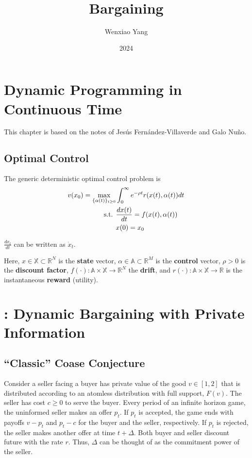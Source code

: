 \documentclass[11pt]{elegantbook}
\title{Bargaining}
\author{Wenxiao Yang}
\institute{Haas School of Business, University of California Berkeley}
\date{2024}
\begin{document}
\maketitle

\frontmatter
\tableofcontents

\mainmatter

\chapter{Dynamic Programming in Continuous Time}
This chapter is based on the notes of Jesús Fernández-Villaverde and Galo Nuño.

\section{Optimal Control}
\begin{definition}
    The generic deterministic optimal control problem is
    \begin{equation}
        \begin{aligned}
            v(x_0)=\max_{\{\alpha(t)\}_{t\geq 0}}&\int_0^\infty e^{-\rho t}r(x(t),\alpha(t))dt\\
            \textnormal{s.t. }&\frac{dx(t)}{dt}=f(x(t),\alpha(t))\\
            &x(0)=x_0
        \end{aligned}
        \nonumber
    \end{equation}
    \begin{note}
        $\frac{dx_t}{dt}$ can be written as $\dot{x}_t$.
    \end{note}
    Here, $x\in\mathbb{X}\subset \mathbb{R}^N$ is the \textbf{state} vector, $\alpha\in \mathbb{A}\subset \mathbb{R}^M$ is the \textbf{control} vector, $\rho>0$ is the \textbf{discount factor}, $f(\cdot):\mathbb{A}\times \mathbb{X} \rightarrow \mathbb{R}^N$ the \textbf{drift}, and $r(\cdot):\mathbb{A}\times \mathbb{X} \rightarrow \mathbb{R}$ is the instantaneous \textbf{reward} (utility).
\end{definition}



\chapter{\cite{fuchs2022dynamic}: Dynamic Bargaining with Private Information}

\section{``Classic'' Coase Conjecture}
Consider a seller facing a buyer has private value of the good $v\in[1,2]$ that is distributed according to an atomless distribution with full support, $F(v)$. The seller has cost $c\geq 0$ to serve the buyer. Every period of an infinite horizon game, the uninformed seller makes an offer $p_t$. If $p_t$ is accepted, the game ends with payoffs $v-p_t$ and $p_t-c$ for the buyer and the seller, respectively. If $p_t$ is rejected, the seller makes another offer at time $t+\Delta$. Both buyer and seller discount future with the rate $r$. Thus, $\Delta$ can be thought of as the commitment power of the seller.
\end{document}
